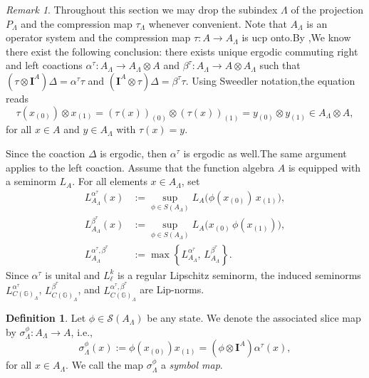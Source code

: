 \documentclass[12pt, reqno]{amsart}
\theoremstyle{definition}
\newtheorem{definition}[theorem]{Definition}
\theoremstyle{remark}
\newtheorem{remark}[theorem]{Remark}
\numberwithin{equation}{section}
\begin{document}
\begin{remark}
Throughout this section we may drop the subindex $\Lambda$ of the projection $P_{\Lambda}$ and the compression map $\tau_{\Lambda}$ whenever convenient.
Note that $A_{\Lambda}$ is an operator system and the compression map $\tau: A \to A_{\Lambda}$ is ucp onto.By \cite{6},We know there exist the following conclusion: there exists unique ergodic commuting right and left coactions 
\(\alpha^{\tau}\colon A_{\Lambda}\to A_{\Lambda}\otimes A\) and \(\beta^{\tau}\colon A_{\Lambda}\to A\otimes A_{\Lambda}\) 
such that 
\((\tau\otimes \mathbf{I}^A)\Delta= \alpha^{\tau}\tau\) and \(( \mathbf{I}^A\otimes\tau)\Delta= \beta^{\tau}\tau\). 
Using Sweedler notation,the equation  reads
\[
\tau(x_{(0)})\otimes x_{(1)} = (\tau(x))_{(0)}\otimes (\tau(x))_{(1)} 
= y_{(0)}\otimes y_{(1)}\in A_{\Lambda}\otimes A,
\]
for all \(x\in A\) and \(y\in A_{\Lambda}\) with \(\tau(x)=y\).

Since the coaction \(\Delta\) is ergodic, then \(\alpha^{\tau}\) is ergodic as well.The same argument applies to the left coaction.
Assume that the function algebra $A$ is equipped with a seminorm $L_A$. For all elements $x \in A_\Lambda$, set
\begin{equation}
\begin{aligned}
L_{ A_\Lambda}^{\alpha^\tau}(x) &:= \sup_{\phi \in S(A_\Lambda)} L_A\!\bigl(\phi(x_{(0)})\,x_{(1)}\bigr), \\
L_{ A_\Lambda}^{\beta^\tau}(x) &:= \sup_{\phi \in S(A_\Lambda)} L_A\!\bigl(x_{(0)}\,\phi(x_{(1)})\bigr), \\
L_{A_{\Lambda}}^{\alpha^\tau,\beta^\tau}
&:= \max\!\left\{L_{A_{\Lambda}}^{\alpha^\tau},\, L_{A_{\Lambda}}^{\beta^\tau}\right\}.
\end{aligned}
\end{equation}
Since $\alpha^\tau$ is unital and $L_\ell^k$ is a regular Lipschitz seminorm, the induced seminorms
$L_{C(\mathbb{G})_\Lambda}^{\alpha^\tau}$, $L_{C(\mathbb{G})_\Lambda}^{\beta^\tau}$, and
$L_{C(\mathbb{G})_\Lambda}^{\alpha^\tau,\beta^\tau}$ are Lip-norms.

 \end{remark}


 


\begin{definition}
Let $\phi \in \mathcal{S}(A_{\Lambda})$ be any state. We denote the associated slice map by $\sigma_\Lambda^\phi : A_{\Lambda} \to A$, i.e.,
\[
\sigma_\Lambda^\phi(x) := \phi(x_{(0)}) x_{(1)} = (\phi \otimes \mathbf{I}^A) \alpha^\tau(x),
\]
for all $x \in A_{\Lambda}$. We call the map $\sigma_\Lambda^\phi$ a \emph{symbol map}.
\end{definition}
\end{document}
